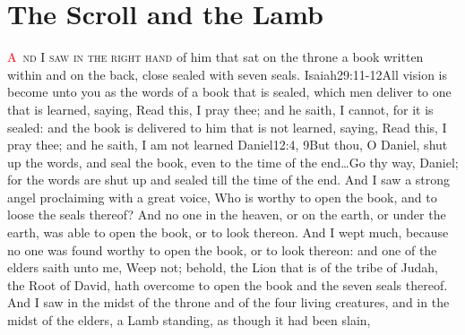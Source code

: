 \chapter{The Scroll and the Lamb}
\fancyhead{} %
\lettrine[lines=3,slope=0.5em]{\textcolor{red}{A}}{\ nd I saw in the right hand} of him that sat on the throne a book written within and on the back, close sealed with seven seals.%
 					{Isaiah}{29:11-12}{All vision is become unto you as the words of a book that is sealed, which men deliver to one that is learned, saying, Read this, I pray thee; and he saith, I cannot, for it is sealed: and the book is delivered to him that is not learned, saying, Read this, I pray thee; and he saith, I am not learned}%
 					{Daniel}{12:4, 9}{But thou, O Daniel, shut up the words, and seal the book, even to the time of the end\ldots Go thy way, Daniel; for the words are shut up and sealed till the time of the end.} %
And I saw a strong angel proclaiming with a great voice, Who is worthy to open the book, and to loose the seals thereof? %
And no one in the heaven, or on the earth, or under the earth, was able to open the book, or to look thereon. %
And I wept much, because no one was found worthy to open the book, or to look thereon: %
and one of the elders saith unto me, Weep not; behold, the Lion that is of the tribe of Judah,%
the Root of David,%
hath overcome to open the book and the seven seals thereof. %
And I saw in the midst of the throne and of the four living creatures, and in the midst of the elders, a Lamb standing, as though it had been slain,%
